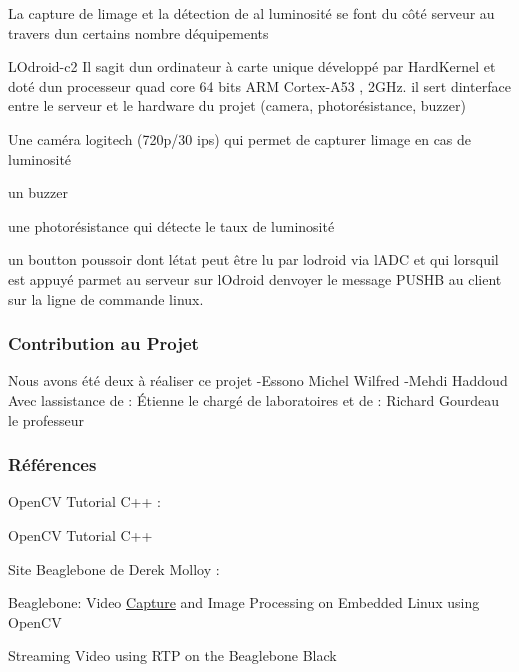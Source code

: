 La capture de l\textquotesingle{}image et la détection de al luminosité se font du côté serveur au travers d\textquotesingle{}un certains nombre d\textquotesingle{}équipements
\begin{DoxyItemize}
\item L\textquotesingle{}Odroid-\/c2 Il s\textquotesingle{}agit d\textquotesingle{}un ordinateur à carte unique développé par Hard\+Kernel et doté d\textquotesingle{}un processeur quad core 64 bits A\+RM Cortex-\/\+A53 , 2\+G\+Hz. il sert d\textquotesingle{}interface entre le serveur et le hardware du projet (camera, photorésistance, buzzer)
\item Une caméra logitech (720p/30 ips) qui permet de capturer l\textquotesingle{}image en cas de luminosité
\item un buzzer
\item une photorésistance qui détecte le taux de luminosité
\item un boutton poussoir dont l\textquotesingle{}état peut être lu par l\textquotesingle{}odroid via l\textquotesingle{}A\+DC et qui lorsqu\textquotesingle{}il est appuyé parmet au serveur sur l\textquotesingle{}Odroid d\textquotesingle{}envoyer le message P\+U\+S\+HB au client sur la ligne de commande linux.
\end{DoxyItemize}

\subsubsection*{Contribution au Projet}

Nous avons été deux à réaliser ce projet -\/\+Essono Michel Wilfred -\/\+Mehdi Haddoud Avec l\textquotesingle{}assistance de \+: Étienne le chargé de laboratoires et de \+: Richard Gourdeau le professeur

\subsubsection*{Références}

Open\+CV Tutorial C++ \+:
\begin{DoxyItemize}
\item Open\+CV Tutorial C++
\end{DoxyItemize}

Site Beaglebone de Derek Molloy \+:
\begin{DoxyItemize}
\item Beaglebone\+: Video \hyperlink{classCapture}{Capture} and Image Processing on Embedded Linux using Open\+CV
\item Streaming Video using R\+TP on the Beaglebone Black
\end{DoxyItemize}

